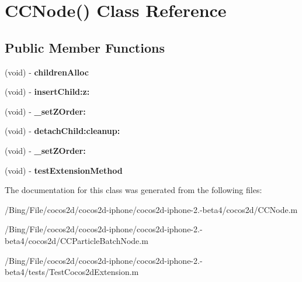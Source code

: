 \hypertarget{interface_c_c_node_07_08}{\section{C\-C\-Node() Class Reference}
\label{interface_c_c_node_07_08}
}
\subsection*{Public Member Functions}
\begin{DoxyCompactItemize}
\item 
\hypertarget{interface_c_c_node_07_08_a1dbface32b6c458c8f76afbd7b0263a8}{(void) -\/ {\bfseries children\-Alloc}}\label{interface_c_c_node_07_08_a1dbface32b6c458c8f76afbd7b0263a8}

\item 
\hypertarget{interface_c_c_node_07_08_ab0b1acbdb510378f589885971fc02594}{(void) -\/ {\bfseries insert\-Child\-:z\-:}}\label{interface_c_c_node_07_08_ab0b1acbdb510378f589885971fc02594}

\item 
\hypertarget{interface_c_c_node_07_08_a3bb56b2628760bf0caecfceb11800cec}{(void) -\/ {\bfseries \-\_\-set\-Z\-Order\-:}}\label{interface_c_c_node_07_08_a3bb56b2628760bf0caecfceb11800cec}

\item 
\hypertarget{interface_c_c_node_07_08_a6c686b8b358242c6d9e916920d5ae0c7}{(void) -\/ {\bfseries detach\-Child\-:cleanup\-:}}\label{interface_c_c_node_07_08_a6c686b8b358242c6d9e916920d5ae0c7}

\item 
\hypertarget{interface_c_c_node_07_08_a3bb56b2628760bf0caecfceb11800cec}{(void) -\/ {\bfseries \-\_\-set\-Z\-Order\-:}}\label{interface_c_c_node_07_08_a3bb56b2628760bf0caecfceb11800cec}

\item 
\hypertarget{interface_c_c_node_07_08_a2656a03b973ab69de23df464b79237ca}{(void) -\/ {\bfseries test\-Extension\-Method}}\label{interface_c_c_node_07_08_a2656a03b973ab69de23df464b79237ca}

\end{DoxyCompactItemize}


The documentation for this class was generated from the following files\-:\begin{DoxyCompactItemize}
\item 
/\-Bing/\-File/cocos2d/cocos2d-\/iphone/cocos2d-\/iphone-\/2.-\/beta4/cocos2d/C\-C\-Node.\-m\item 
/\-Bing/\-File/cocos2d/cocos2d-\/iphone/cocos2d-\/iphone-\/2.-\/beta4/cocos2d/C\-C\-Particle\-Batch\-Node.\-m\item 
/\-Bing/\-File/cocos2d/cocos2d-\/iphone/cocos2d-\/iphone-\/2.-\/beta4/tests/Test\-Cocos2d\-Extension.\-m\end{DoxyCompactItemize}

